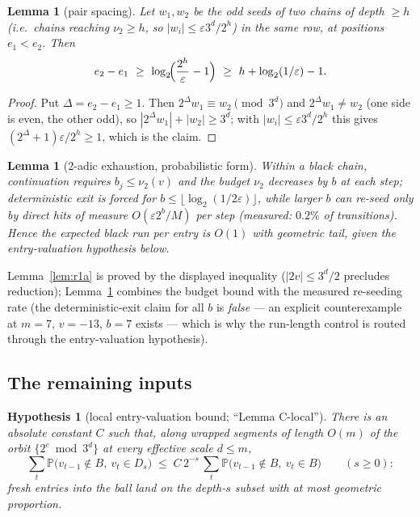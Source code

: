 \documentclass[11pt]{article}
\newtheorem{lemma}[theorem]{Lemma}
\newtheorem{hypothesis}[theorem]{Hypothesis}
\theoremstyle{definition}
\newcommand{\Prob}{\mathbb{P}}
\newcommand{\floor}[1]{\lfloor #1\rfloor}
\begin{document}
\begin{lemma}[pair spacing]\label{lem:pair}
Let $w_1,w_2$ be the odd seeds of two chains of depth $\ge h$ (i.e.\
chains reaching $\nu_2\ge h$, so $|w_i|\le\varepsilon 3^d/2^h$) in the
same row, at positions $e_1<e_2$. Then
\[
e_2-e_1\ \ge\ \log_2\!\Bigl(\frac{2^h}{\varepsilon}-1\Bigr)
\ \ge\ h+\log_2(1/\varepsilon)-1 .
\]
\end{lemma}

\begin{proof}
Put $\Delta=e_2-e_1\ge 1$. Then $2^{\Delta}w_1\equiv w_2\pmod{3^d}$ and
$2^{\Delta}w_1\ne w_2$ (one side is even, the other odd), so
$|2^{\Delta}w_1|+|w_2|\ge 3^d$; with $|w_i|\le\varepsilon 3^d/2^h$ this
gives $(2^{\Delta}+1)\varepsilon/2^h\ge 1$, which is the claim.
\end{proof}

\begin{lemma}[$2$-adic exhaustion, probabilistic form]\label{lem:exhaust}
Within a black chain, continuation requires $b_j\le\nu_2(v)$ and the
budget $\nu_2$ decreases by $b$ at each step; deterministic exit is
forced for $b\le\floor{\log_2(1/2\varepsilon)}$, while larger $b$ can
re-seed only by direct hits of measure $O(\varepsilon 2^{b}/M)$ per
step (measured: $0.2\%$ of transitions). Hence the expected black run
per entry is $O(1)$ with geometric tail, \emph{given} the entry-valuation
hypothesis below.
\end{lemma}

Lemma~\ref{lem:r1a} is proved by the displayed inequality
($|2v|\le 3^d/2$ precludes reduction); Lemma~\ref{lem:exhaust} combines the
budget bound with the measured re-seeding rate (the deterministic-exit
claim for all $b$ is \emph{false} --- an explicit counterexample at
$m=7$, $v=-13$, $b=7$ exists --- which is why the run-length control is
routed through the entry-valuation hypothesis).

\subsection{The remaining inputs}

\begin{hypothesis}[local entry-valuation bound; ``Lemma C-local'']
\label{hyp:clocal}
There is an absolute constant $C$ such that, along wrapped segments of
length $O(m)$ of the orbit $\{2^e \bmod 3^d\}$ at every effective scale
$d\le m$,
\[
\sum_t \Prob\bigl(v_{t-1}\notin B,\ v_t\in D_s\bigr)
\;\le\; C\,2^{-s}\,\sum_t \Prob\bigl(v_{t-1}\notin B,\ v_t\in B\bigr)
\qquad (s\ge 0):
\]
fresh entries into the ball land on the depth-$s$ subset with at most
geometric proportion.
\end{hypothesis}
\end{document}
